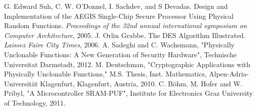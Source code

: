 \documentclass[letterpaper, 10pt, conference]{ieeeconf}  %
\begin{document}
















\begin{thebibliography}{99}

 G. Edward Suh, C. W. O'Donnel, I. Sachdev, and S Devadas. Design and Implementation of the AEGIS Single-Chip Secure Processor Using Physical Random Functions. \emph{Proceedings of the 32nd annual international symposium on Computer Architecture}, 2005.
 J. Orlin Grabbe. The DES Algorithm Illustrated. \emph{Laissez Faire City Times}, 2006.
 A. Sadeghi and C. Wachsmann, "Physically Unclonable Functions: A New Generation of Security Hardware", Technische Universitat Darmstadt, 2012.
 M. Deutschman, "Cryptographic Applications with Physically Unclonable Functions," M.S. Thesis, Inst. Mathematics, Alpen-Adria-Universit\"{a}t Klagenfurt, Klagenfurt, Austria, 2010.
 C. Böhm, M. Hofer and W. Pribyl, "A Microcontroller SRAM-PUF", Institute for Electronics Graz University of Technology, 2011.
 
\end{thebibliography}
\end{document}
